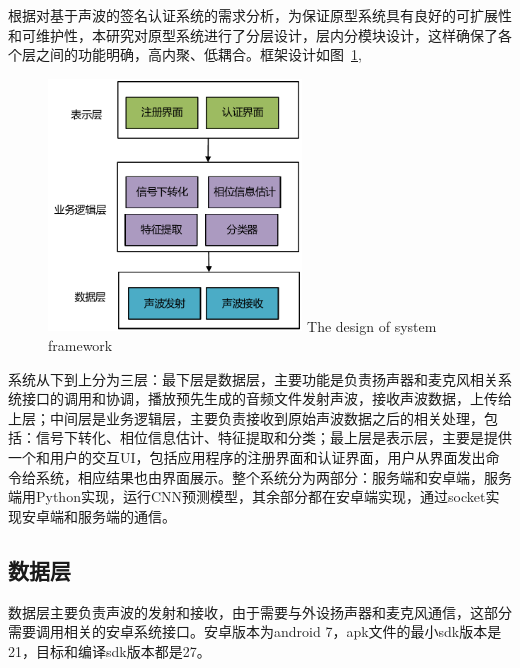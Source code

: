 根据对基于声波的签名认证系统的需求分析，为保证原型系统具有良好的可扩展性和可维护性，本研究对原型系统进行了分层设计，层内分模块设计，这样确保了各个层之间的功能明确，高内聚、低耦合。框架设计如图~\ref{fig:system-framework},
\begin{figure}[!htp]
  \centering
  \includegraphics[width=0.6\textwidth]{figure/prototype-architecture.pdf}
      {The design of system framework}
  \label{fig:system-framework}
\end{figure}
系统从下到上分为三层：最下层是数据层，主要功能是负责扬声器和麦克风相关系统接口的调用和协调，播放预先生成的音频文件发射声波，接收声波数据，上传给上层；中间层是业务逻辑层，主要负责接收到原始声波数据之后的相关处理，包括：信号下转化、相位信息估计、特征提取和分类；最上层是表示层，主要是提供一个和用户的交互UI，包括应用程序的注册界面和认证界面，用户从界面发出命令给系统，相应结果也由界面展示。整个系统分为两部分：服务端和安卓端，服务端用Python实现，运行CNN预测模型，其余部分都在安卓端实现，通过socket实现安卓端和服务端的通信。 


\subsection{数据层}
数据层主要负责声波的发射和接收，由于需要与外设扬声器和麦克风通信，这部分需要调用相关的安卓系统接口。安卓版本为android 7，apk文件的最小sdk版本是21，目标和编译sdk版本都是27。

